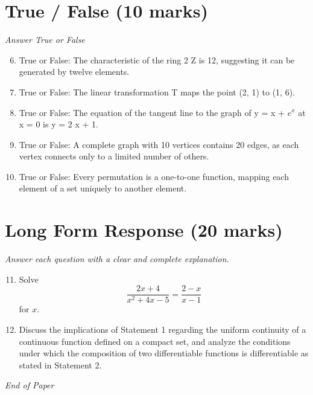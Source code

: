 \documentclass[12pt]{article}
\begin{document}
\section*{True / False (10 marks)}
\textit{Answer True or False}
\begin{enumerate}[label=\arabic*.]
\setcounter{enumi}{5}
\item True or False: The characteristic of the ring 2 Z is 12, suggesting it can be generated by twelve elements.
\item True or False: The linear transformation T maps the point (2, 1) to (1, 6).
\item True or False: The equation of the tangent line to the graph of y = x + $e^x$ at x = 0 is y = 2 x + 1.
\item True or False: A complete graph with 10 vertices contains 20 edges, as each vertex connects only to a limited number of others.
\item True or False: Every permutation is a one-to-one function, mapping each element of a set uniquely to another element.
\end{enumerate}

\section*{Long Form Response (20 marks)}
\textit{Answer each question with a clear and complete explanation.}
\begin{enumerate}[label=\arabic*.]
\setcounter{enumi}{10}
\item Solve \[\frac{2 x+4}{x^2+4 x-5}=\frac{2-x}{x-1}\]for $x$.
\item Discuss the implications of Statement 1 regarding the uniform continuity of a continuous function defined on a compact set, and analyze the conditions under which the composition of two differentiable functions is differentiable as stated in Statement 2.
\end{enumerate}

\vfill
\noindent\textit{End of Paper}
\end{document}
